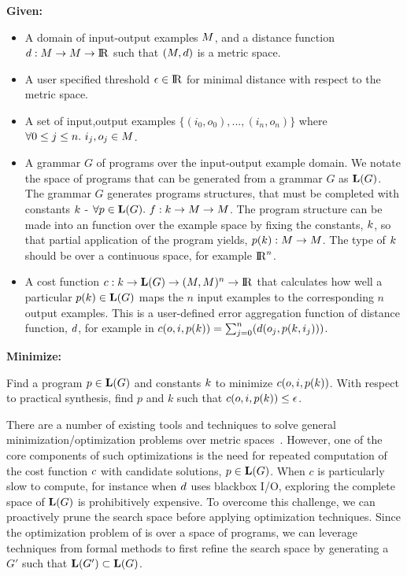 \noindent\textbf{Given:}
\begin{itemize}[topsep=0pt]
  \item A domain of input-output examples $M$, and a distance function $d:M \to M \to {\rm I\!R}$ such that $(M,{d})$ is a metric space.
  \item A user specified threshold $\epsilon \in {\rm I\!R}$ for minimal distance with respect to the metric space.
  \item A set of input,output examples $\{(i_0,o_0),...,(i_n,o_n)\}$ where $\forall 0 \leq j \leq n.\ i_j,o_j \in M$.
  \item A grammar $G$ of programs over the input-output example domain. 
        We notate the space of programs that can be generated from a grammar $G$ as $\mathbf{L}(G)$.
        The grammar $G$ generates programs structures, that must be completed with constants ${k}$ - $\forall p \in \mathbf{L}(G).\ f: {k} \to M \to M$. 
        The program structure can be made into an function over the example space by fixing the constants, ${k}$, so that partial application of the program yields, $p({k}): M \to M$. 
        The type of ${k}$ should be over a continuous space, for example ${\rm I\!R}^n$. 
  \item A cost function ${c} : {k} \to \mathbf{L}(G) \to (M,M)^n \to {\rm I\!R}$ that calculates how well a particular $p({k}) \in \mathbf{L}(G)$ maps the $n$ input examples to the corresponding $n$ output examples. This is a user-defined error aggregation function of distance function, ${d}$, for example in ${c}(o,i,p({k})) = \sum_{j=0}^{n} ({d}(o_j,p({k},i_j)))$.
\end{itemize}
\textbf{Minimize:}

Find a program $p \in \mathbf{L}(G)$ and constants ${k}$ to minimize ${c}(o,i,p({k}))$. 
With respect to practical synthesis, find $p$ and $k$ such that ${c}(o,i,p({k})) \leq \epsilon$.
\vspace{\baselineskip}

There are a number of existing tools and techniques to solve general minimization/optimization problems over metric spaces~\cite{optmizationTextbook}.
However, one of the core components of such optimizations is the need for repeated computation of the cost function ${c}$ with candidate solutions, $p \in \mathbf{L}(G)$.
When $c$ is particularly slow to compute, for instance when ${d}$ uses blackbox I/O, exploring the complete space of $\mathbf{L}(G)$ is prohibitively expensive.
To overcome this challenge, we can proactively prune the search space before applying optimization techniques.
Since the optimization problem of \approximatePBE is over a space of programs, we can leverage techniques from formal methods to first refine the search space by generating a $G'$ such that $\mathbf{L}(G') \subset \mathbf{L}(G)$.

